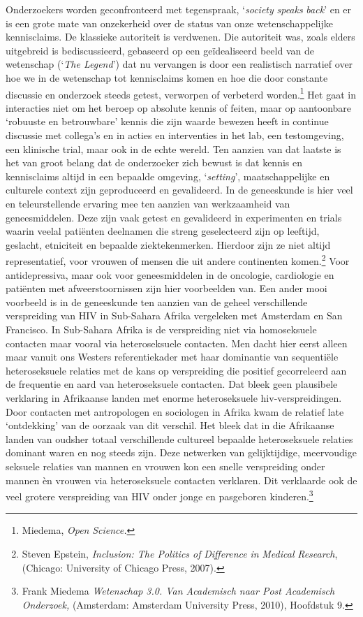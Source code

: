 \documentclass[smallauthor, chapterhaspagenum, nochapterinheader, pagenuminheader,  bigchapnum,medium2, tocpages,  garamond, titleinheader]{jote-book}
\begin{document}
	Onderzoekers worden geconfronteerd met tegenspraak, ‘\emph{society }\emph{speaks}\emph{ back}' en er is een grote mate van onzekerheid over de status van onze wetenschappelijke kennisclaims. De klassieke autoriteit is verdwenen. Die autoriteit was, zoals elders uitgebreid is bediscussieerd, gebaseerd op een geïdealiseerd beeld van de wetenschap (‘\emph{The Legend}') dat nu vervangen is door een realistisch narratief over hoe we in de wetenschap tot kennisclaims komen en hoe die door constante discussie en onderzoek steeds getest, verworpen of verbeterd worden.\footnote{Miedema, \emph{Open }\emph{Science}\emph{.}} Het gaat in interacties niet om het beroep op absolute kennis of feiten, maar op aantoonbare ‘robuuste en betrouwbare' kennis die zijn waarde bewezen heeft in continue discussie met collega's en in acties en interventies in het lab, een testomgeving, een klinische trial, maar ook in de echte wereld. Ten aanzien van dat laatste is het van groot belang dat de onderzoeker zich bewust is dat kennis en kennisclaims altijd in een bepaalde omgeving, ‘\emph{setting}', maatschappelijke en culturele context zijn geproduceerd en gevalideerd. In de geneeskunde is hier veel en teleurstellende ervaring mee ten aanzien van werkzaamheid van geneesmiddelen. Deze zijn vaak getest en gevalideerd in experimenten en trials waarin veelal patiënten deelnamen die streng geselecteerd zijn op leeftijd, geslacht, etniciteit en bepaalde ziektekenmerken. Hierdoor zijn ze niet altijd representatief, voor vrouwen of mensen die uit andere continenten komen.\footnote{Steven Epstein, \emph{Inclusion}\emph{: The Politics of }\emph{Difference}\emph{ in }\emph{Medical}\emph{ Research}, (Chicago: University of Chicago Press, 2007).}\emph{ }Voor antidepressiva, maar ook voor geneesmiddelen in de oncologie, cardiologie en patiënten met afweerstoornissen zijn hier voorbeelden van. Een ander mooi voorbeeld is in de geneeskunde ten aanzien van de geheel verschillende verspreiding van HIV in Sub-Sahara Afrika vergeleken met Amsterdam en San Francisco. In Sub-Sahara Afrika is de verspreiding niet via homoseksuele contacten maar vooral via heteroseksuele contacten. Men dacht hier eerst alleen maar vanuit ons Westers referentiekader met haar dominantie van sequentiële heteroseksuele relaties met de kans op verspreiding die positief gecorreleerd aan de frequentie en aard van heteroseksuele contacten. Dat bleek geen plausibele verklaring in Afrikaanse landen met enorme heteroseksuele hiv-verspreidingen. Door contacten met antropologen en sociologen in Afrika kwam de relatief late ‘ontdekking' van de oorzaak van dit verschil. Het bleek dat in die Afrikaanse landen van oudsher totaal verschillende cultureel bepaalde heteroseksuele relaties dominant waren en nog steeds zijn. Deze netwerken van gelijktijdige, meervoudige seksuele relaties van mannen en vrouwen kon een snelle verspreiding onder mannen èn vrouwen via heteroseksuele contacten verklaren. Dit verklaarde ook de veel grotere verspreiding van HIV onder jonge en pasgeboren kinderen.\footnote{Frank Miedema \emph{Wetenschap 3.0. Van Academisch naar Post Academisch Onderzoek}\emph{, }(Amsterdam: Amsterdam University Press, 2010), Hoofdstuk 9. }
\end{document}
